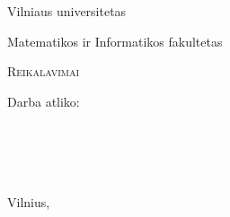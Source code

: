 ﻿
\begin{titlepage}

	\begin{center}
	
		\large {Vilniaus universitetas
	
				Matematikos ir Informatikos fakultetas}
			
		\vspace*{\fill}
	
	\textsc{Reikalavimai} \\[0.5cm]

	\vspace{3cm}
		\begin{flushright}
			\begin{minipage}{0.35\textwidth}
			{\large Darba atliko:} \\
				\KJ \\
				\UC \\
				\OK \\
				\DK \\
				\RK
			\end{minipage}
		\end{flushright}
	\vspace{\fill}
		{\Large Vilnius, \the\year}	
	\end{center}
\end{titlepage}